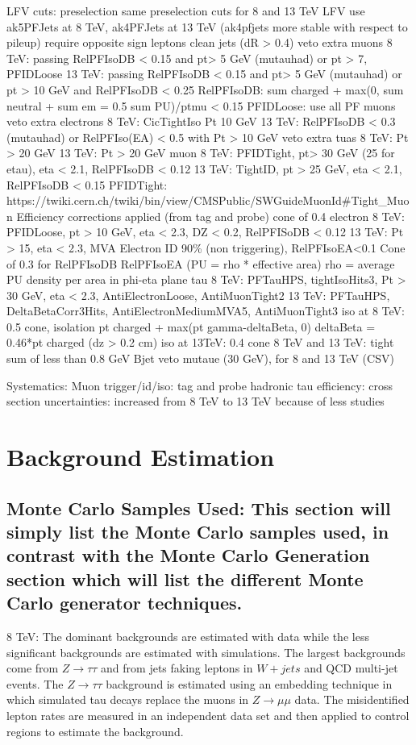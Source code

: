 LFV cuts:
preselection
same preselection cuts for 8 and 13 TeV LFV
use ak5PFJets at 8 TeV, ak4PFJets at 13 TeV (ak4pfjets more stable with respect to pileup)
require opposite sign leptons
clean jets (dR > 0.4)
veto extra muons
	8 TeV:  passing RelPFIsoDB < 0.15 and pt> 5 GeV (mutauhad) or pt > 7, PFIDLoose
	13 TeV: passing RelPFIsoDB < 0.15 and pt> 5 GeV (mutauhad) or pt > 10 GeV and RelPFIsoDB < 0.25
	RelPFIsoDB: sum charged + max(0, sum neutral + sum em = 0.5 sum PU)/ptmu < 0.15
	PFIDLoose: use all PF muons
veto extra electrons
	8 TeV: CicTightIso Pt  10 GeV
	13 TeV: RelPFIsoDB < 0.3 (mutauhad) or RelPFIso(EA) < 0.5 with Pt > 10 GeV
veto extra tuas
	8 TeV: Pt > 20 GeV
	13 TeV: Pt > 20 GeV
muon
	8 TeV: PFIDTight, pt> 30 GeV (25 for etau), eta < 2.1, RelPFIsoDB < 0.12
	13 TeV: TightID, pt > 25 GeV, eta < 2.1, RelPFIsoDB < 0.15
	PFIDTight: https://twiki.cern.ch/twiki/bin/view/CMSPublic/SWGuideMuonId#Tight_Muon
	Efficiency corrections applied (from tag and probe)
	cone of 0.4
electron
	8 TeV: PFIDLoose, pt > 10 GeV, eta < 2.3, DZ < 0.2, RelPFISoDB < 0.12
	13 TeV: Pt > 15, eta < 2.3, MVA Electron ID 90\% (non triggering), RelPFIsoEA<0.1
	Cone of 0.3 for RelPFIsoDB
	RelPFIsoEA (PU = rho * effective area)
	rho = average PU density per area in phi-eta plane
tau
	8 TeV: PFTauHPS, tightIsoHits3, Pt > 30 GeV, eta < 2.3, AntiElectronLoose, AntiMuonTight2
	13 TeV: PFTauHPS, DeltaBetaCorr3Hits, AntiElectronMediumMVA5, AntiMuonTight3
	iso at 8 TeV: 0.5 cone, isolation pt charged + max(pt gamma-deltaBeta, 0)
	deltaBeta = 0.46*pt charged (dz > 0.2 cm)
	iso at 13TeV: 0.4 cone
	8 TeV and 13 TeV: tight sum of less than 0.8 GeV
Bjet veto mutaue (30 GeV), for 8 and 13 TeV (CSV)

Systematics:
Muon trigger/id/iso: tag and probe
hadronic tau efficiency: 
cross section uncertainties: increased from 8 TeV to 13 TeV because of less studies

\section{Background Estimation}

\subsection{Monte Carlo Samples Used: This section will simply list the Monte Carlo samples used, in contrast with the Monte Carlo Generation section which will list the different Monte Carlo generator techniques.}
8 TeV:
The dominant backgrounds are estimated with data  while the less significant
backgrounds are estimated with simulations.  The largest backgrounds come from $Z \to \tau \tau$
and from jets faking leptons in $W+jets$ and QCD multi-jet events. The $Z \to \tau \tau$
background is estimated using an embedding technique in which simulated tau decays replace
the muons in $Z \to \mu \mu$ data. The misidentified lepton rates are measured in an independent data
set and then applied to control regions to estimate the background.



